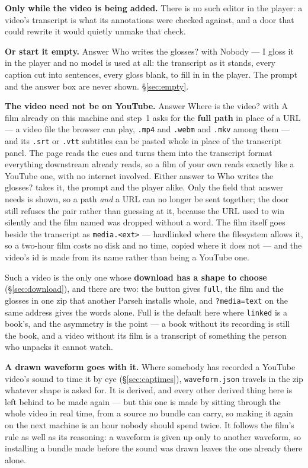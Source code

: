\documentclass[11pt,oneside]{report}
\newcommand{\file}[1]{\texttt{#1}}
\newcommand{\menu}[1]{\textsf{#1}}
\begin{document}
\textbf{Only while the video is being added.} There is no such editor in the
player: a video's transcript is what its annotations were checked against,
and a door that could rewrite it would quietly unmake that check.

\textbf{Or start it empty.} Answer \menu{Who writes the glosses?} with
\menu{Nobody --- I gloss it in the player} and no model is used at all: the
transcript as it stands, every caption cut into sentences, every gloss blank,
to fill in in the player. The prompt and the answer box are never shown.
\S\ref{sec:empty}.

\textbf{The video need not be on YouTube.} Answer \menu{Where is the video?}
with \menu{A film already on this machine} and step~1 asks for the
\textbf{full path} in place of a URL --- a video file the browser can play,
\file{.mp4} and \file{.webm} and \file{.mkv} among them --- and its
\file{.srt} or \file{.vtt} subtitles can be pasted whole in place of the
transcript panel. The page reads the cues and turns them
into the transcript format everything downstream already reads, so a film of
your own reads exactly like a YouTube one, with no internet involved. Either
answer to \menu{Who writes the glosses?} takes it, the prompt and the player
alike. Only the field that answer needs is shown, so a path \emph{and} a URL
can no longer be sent together; the door still refuses the pair rather than
guessing at it, because the URL used to win silently and the film named was
dropped without a word. The film itself goes beside the transcript as
\file{media.<ext>} --- hardlinked where the filesystem allows it, so a
two-hour film costs no disk and no time, copied where it does not --- and
the video's id is made from its name rather than being a YouTube one.

Such a video is the only one whose \textbf{download has a shape to choose}
(\S\ref{sec:download}), and there are two: the button gives \texttt{full},
the film and the glosses in one zip that another Parseh installs whole, and
\texttt{?media=text} on the same address gives the words alone. Full is the
default here where \texttt{linked} is a book's, and the asymmetry is the
point --- a book without its recording is still the book, and a video
without its film is a transcript of something the person who unpacks it
cannot watch.

\textbf{A drawn waveform goes with it.} Where somebody has recorded a
YouTube video's sound to time it by eye (\S\ref{sec:captimes}),
\file{waveform.json} travels in the zip whatever shape is asked for. It is
derived, and every other derived thing here is left behind to be made again
--- but this one is made by sitting through the whole video in real time,
from a source no bundle can carry, so making it again on the next machine is
an hour nobody should spend twice. It follows the film's rule as well as its
reasoning: a waveform is given up only to another waveform, so installing a
bundle made before the sound was drawn leaves the one already there alone.
\end{document}
